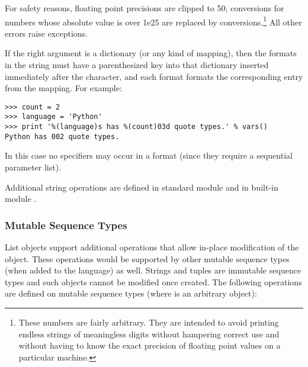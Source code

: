 For safety reasons, floating point precisions are clipped to 50;
 conversions for numbers whose absolute value is over 1e25
are replaced by  conversions.\footnote{
  These numbers are fairly arbitrary.  They are intended to
  avoid printing endless strings of meaningless digits without hampering
  correct use and without having to know the exact precision of floating
  point values on a particular machine.}
All other errors raise exceptions.

If the right argument is a dictionary (or any kind of mapping), then
the formats in the string must have a parenthesized key into that
dictionary inserted immediately after the \character{\%} character,
and each format formats the corresponding entry from the mapping.
For example:

\begin{verbatim}
>>> count = 2
>>> language = 'Python'
>>> print '%(language)s has %(count)03d quote types.' % vars()
Python has 002 quote types.
\end{verbatim}

In this case no \code{*} specifiers may occur in a format (since they
require a sequential parameter list).

Additional string operations are defined in standard module
 and in built-in module .

\subsubsection{Mutable Sequence Types \label{typesseq-mutable}}

List objects support additional operations that allow in-place
modification of the object.
These operations would be supported by other mutable sequence types
(when added to the language) as well.
Strings and tuples are immutable sequence types and such objects cannot
be modified once created.
The following operations are defined on mutable sequence types (where
 is an arbitrary object):

